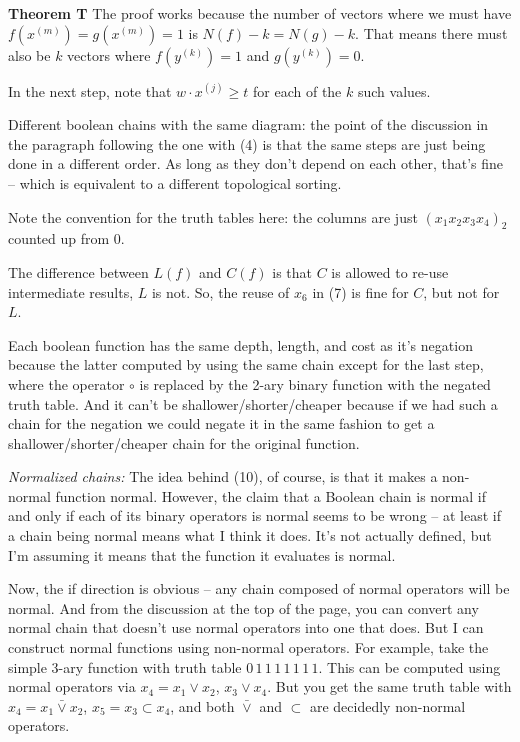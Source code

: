  {\bf Theorem T} \hfil\break
The proof works because the number
of vectors where we must have $f\left(x^{\left(m\right)}\right) = 
g\left(x^{\left(m\right)}\right) = 1$ is $N\left(f\right) - k = N\left(g\right) - k$.
That means there must also be $k$ vectors where $f\left(y^{\left(k\right)}\right) = 1$
and $g\left(y^{\left(k\right)}\right) = 0$.

In the next step, note that $w \cdot x^{\left(j\right)} \geq t$ for each of the $k$
such values. 


\noindent [p 97] Different boolean chains with the same diagram: the point
of the discussion in the paragraph following the one with (4) is that the same
steps are just being done in a different order.  As long as they don't depend
on each other, that's fine -- which is equivalent to a different topological sorting.

 Note the convention for the truth tables here:
the columns are just $\left(x_1 x_2 x_3 x_4\right)_2$ counted up from 0.

 The difference between $L\left(f\right)$
and $C\left(f\right)$ is that $C$ is allowed to re-use intermediate results,
$L$ is not.  So, the reuse of $x_6$ in (7) is fine for $C$, but not for $L$.

\vskip 0.1in 

\noindent [p 99] Each boolean function has the same depth, length,
and cost as it's negation because the latter computed by using the same
chain except for the last step, where the operator $\circ$ is replaced
by the 2-ary binary function with the negated truth table.  And it can't
be shallower/shorter/cheaper because if we had such a chain for the
negation we could negate it in the same fashion to get a shallower/shorter/cheaper
chain for the original function.

 {\it Normalized chains:} The idea behind (10),
of course, is that it makes a non-normal function normal.  However, the claim
that a Boolean chain is normal if and only if each of its binary operators is
normal seems to be wrong -- at least if a chain being normal means what
I think it does.  It's not actually defined, but I'm assuming it means that the
function it evaluates is normal.  

Now, the if direction is obvious -- any chain composed of normal operators
will be normal.  And from the discussion at the top of the page, you can convert
any normal chain that doesn't use normal operators into one that does.
But I can construct normal functions using non-normal operators.
For example, take the simple 3-ary function with truth table
$0\,1\,1\,1\,1\,1\,1\,1$.  This can be computed using normal
operators via $x_4 = x_1 \lor x_2$, $x_3 \lor x_4$.  But you get
the same truth table with $x_4 = x_1 \bar \lor x_2$, $x_5 = x_3 \subset x_4$,
and both $\bar \lor$ and $\subset$ are decidedly non-normal operators.

